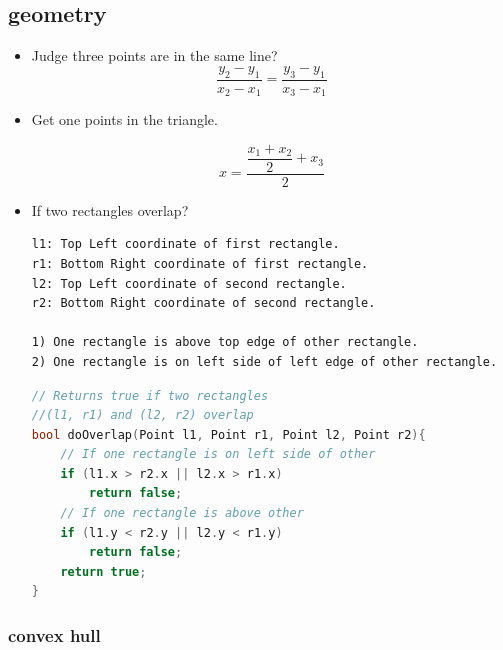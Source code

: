 \documentclass[a4paper,11pt,twoside]{book}
\begin{document}
\subsection{geometry}
\begin{itemize}
\item Judge three points are in the same line?
\[
\dfrac{y_{2}-y_{1}}{x_{2}-x_{1}}  = \dfrac{y_{3}-y_{1}}{x_{3}-x_{1}}
\]

\item Get one points in the triangle. 

\[
x = \dfrac{\dfrac{x_{1}+x_{2}}{2}+x_{3}}{2}
\]

\item If two rectangles overlap?
\begin{verbatim}
l1: Top Left coordinate of first rectangle.
r1: Bottom Right coordinate of first rectangle.
l2: Top Left coordinate of second rectangle.
r2: Bottom Right coordinate of second rectangle.

1) One rectangle is above top edge of other rectangle.
2) One rectangle is on left side of left edge of other rectangle.
\end{verbatim}

\begin{lstlisting}[frame=single, language=c++]
// Returns true if two rectangles 
//(l1, r1) and (l2, r2) overlap
bool doOverlap(Point l1, Point r1, Point l2, Point r2){
    // If one rectangle is on left side of other
    if (l1.x > r2.x || l2.x > r1.x)
        return false;
    // If one rectangle is above other
    if (l1.y < r2.y || l2.y < r1.y)
        return false;
    return true;
}
\end{lstlisting}

\end{itemize}

\subsubsection{convex hull}
\end{document}
